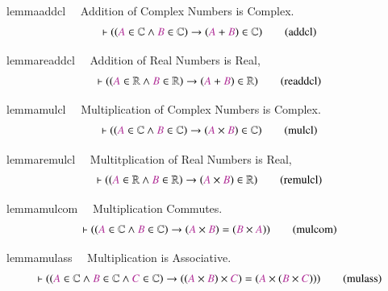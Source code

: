 \begin{restatable}{lemma}{addcl}~~ Addition of Complex Numbers is Complex.~
\begin{align}
\vdash ( ( \mc{A} \in \mathbb{C} \wedge \mc{B} \in \mathbb{C} ) \rightarrow (
    \mc{A} + \mc{B} ) \in \mathbb{C} )\label{eq:addcl}\tag{addcl}
\end{align}
\end{restatable}

\begin{restatable}{lemma}{readdcl}~~ Addition of Real Numbers is Real,     ~
\begin{align}
\vdash ( ( \mc{A} \in \mathbb{R} \wedge \mc{B} \in \mathbb{R} ) \rightarrow (
    \mc{A} + \mc{B} ) \in \mathbb{R} )\label{eq:readdcl}\tag{readdcl}
\end{align}
\end{restatable}

\begin{restatable}{lemma}{mulcl}~~ Multiplication of Complex Numbers is Complex.     ~
\begin{align}
\vdash ( ( \mc{A} \in \mathbb{C} \wedge \mc{B} \in \mathbb{C} ) \rightarrow (
    \mc{A} \times \mc{B} ) \in \mathbb{C} )\label{eq:mulcl}\tag{mulcl}
\end{align}
\end{restatable}

\begin{restatable}{lemma}{remulcl}~~ Multitplication  of Real Numbers is Real,    ~
\begin{align}
\vdash ( ( \mc{A} \in \mathbb{R} \wedge \mc{B} \in \mathbb{R} ) \rightarrow (
    \mc{A} \times \mc{B} ) \in \mathbb{R} )\label{eq:remulcl}\tag{remulcl}
\end{align}
\end{restatable}

\begin{restatable}{lemma}{mulcom}~~ Multiplication Commutes.     ~
\begin{align}
\vdash ( ( \mc{A} \in \mathbb{C} \wedge \mc{B} \in \mathbb{C} ) \rightarrow (
    \mc{A} \times \mc{B} ) = ( \mc{B} \times \mc{A} )
    )\label{eq:mulcom}\tag{mulcom}
\end{align}
\end{restatable}

\begin{restatable}{lemma}{mulass}~~ 
Multiplication is Associative.
\begin{align}
\vdash ( ( \mc{A} \in \mathbb{C} \wedge \mc{B} \in \mathbb{C} \wedge \mc{C} \in
    \mathbb{C} ) \rightarrow ( ( \mc{A} \times \mc{B} ) \times \mc{C} ) = (
    \mc{A} \times ( \mc{B} \times \mc{C} ) ) )\label{eq:mulass}\tag{mulass}
\end{align}
\end{restatable}

